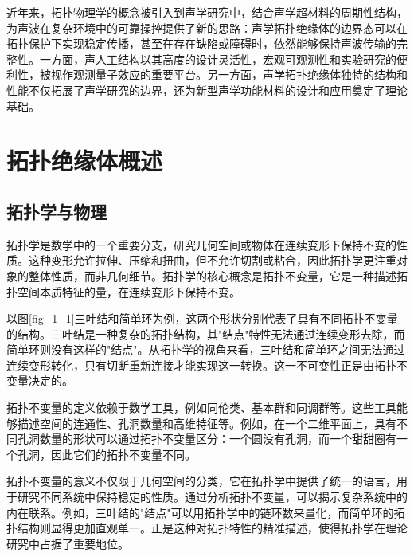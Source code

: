 近年来，拓扑物理学的概念被引入到声学研究中，结合声学超材料的周期性结构，为声波在复杂环境中的可靠操控提供了新的思路：声学拓扑绝缘体的边界态可以在拓扑保护下实现稳定传播，甚至在存在缺陷或障碍时，依然能够保持声波传输的完整性。一方面，声人工结构以其高度的设计灵活性，宏观可观测性和实验研究的便利性，被视作观测量子效应的重要平台。另一方面，声学拓扑绝缘体独特的结构和性能不仅拓展了声学研究的边界，还为新型声学功能材料的设计和应用奠定了理论基础。


\section{拓扑绝缘体概述}
\subsection{拓扑学与物理}
拓扑学是数学中的一个重要分支，研究几何空间或物体在连续变形下保持不变的性质\cite{d1}。这种变形允许拉伸、压缩和扭曲，但不允许切割或粘合，因此拓扑学更注重对象的整体性质，而非几何细节。拓扑学的核心概念是拓扑不变量，它是一种描述拓扑空间本质特征的量，在连续变形下保持不变。

以图\ref{fig_1_1}三叶结和简单环为例，这两个形状分别代表了具有不同拓扑不变量的结构。三叶结是一种复杂的拓扑结构，其"结点"特性无法通过连续变形去除，而简单环则没有这样的"结点"。从拓扑学的视角来看，三叶结和简单环之间无法通过连续变形转化，只有切断重新连接才能实现这一转换。这一不可变性正是由拓扑不变量决定的。

拓扑不变量的定义依赖于数学工具，例如同伦类、基本群和同调群等。这些工具能够描述空间的连通性、孔洞数量和高维特征等。例如，在一个二维平面上，具有不同孔洞数量的形状可以通过拓扑不变量区分：一个圆没有孔洞，而一个甜甜圈有一个孔洞，因此它们的拓扑不变量不同。

拓扑不变量的意义不仅限于几何空间的分类，它在拓扑学中提供了统一的语言，用于研究不同系统中保持稳定的性质。通过分析拓扑不变量，可以揭示复杂系统中的内在联系。例如，三叶结的"结点"可以用拓扑学中的链环数来量化，而简单环的拓扑结构则显得更加直观单一。正是这种对拓扑特性的精准描述，使得拓扑学在理论研究中占据了重要地位。

